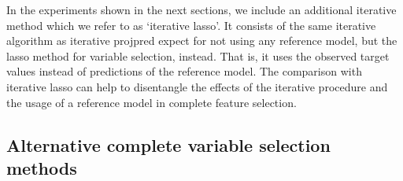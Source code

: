 \documentclass[a4]{article}
\theoremstyle{definition}
\newcommand{\note}[1]{\textcolor{red}{#1}}
\begin{document}
In the experiments shown in the next sections, we include an additional iterative
method which we refer to as `iterative lasso'. It consists of the same iterative
algorithm as iterative projpred expect for not using any reference model, but
the lasso method for variable selection, instead.
That is, it uses the observed target values instead of predictions of the reference model.
The comparison with iterative lasso can help to disentangle the effects
of the iterative procedure and the usage of a reference model in complete feature selection.

\subsection{Alternative complete variable selection methods}


\end{document}
